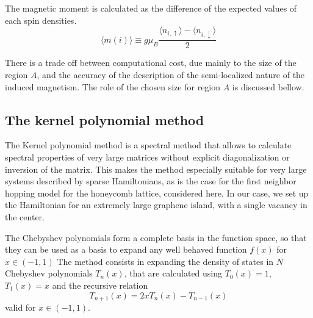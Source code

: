 \documentclass[aps,prb,twocolumn,superscriptaddress]{revtex4-1}
\begin{document}
The magnetic moment is calculated as the difference of the expected values of each spin densities.
\begin{equation}
\langle m(i)\rangle \equiv g\mu_B\frac{\langle n_{i,\uparrow}\rangle-\langle n_{i,\downarrow}\rangle}{2}
\label{sz}
\end{equation}

There is a trade off between computational cost, due mainly to the size of the region $A$, and the accuracy of the description of the semi-localized nature of the induced magnetism. The role of the chosen size for region $A$ is discussed bellow.


\subsection{The kernel polynomial method}
The Kernel polynomial method\cite{Weisse2006} is a spectral method that allows to calculate spectral properties of very large matrices without explicit diagonalization or inversion of the matrix.
This makes the method especially suitable for very large systems described by sparse Hamiltonians, as is the case for the first neighbor hopping model for the honeycomb lattice, considered here.
In our case, we set up the Hamiltonian for an extremely large graphene island, with a single vacancy in the center.

{The Chebyshev polynomials form a complete basis in the function space, so that they can be used as a basis to expand any well behaved function} $f(x)$ for $x\in (-1, 1)$
The method consists in expanding the density of states in $N$ Chebyshev polynomials $T_n(x)$,  that are calculated using $T_0(x)=1$, $T_1(x)=x$ and the recursive relation
\begin{equation}
T_{n+1} (x) = 2 x T_n(x) - T_{n-1} (x)
\end{equation}
valid for $x\in (-1,1)$.
\end{document}
